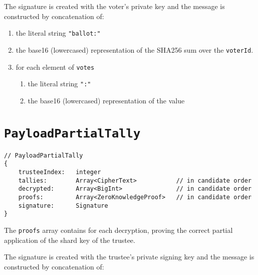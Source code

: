 The signature is created with the voter's private key and the message is constructed by concatenation of:


\begin{enumerate}
  \item the literal string \lstinline[style=ES6]{"ballot:"}
  \item the base16 (lowercased) representation of the SHA256 sum over the \texttt{voterId}.
  \item for each element of \texttt{votes}
        \begin{enumerate}
          \item the literal string \lstinline[style=ES6]{":"}
          \item the base16 (lowercased) representation of the value
        \end{enumerate}
\end{enumerate}

\section*{\texttt{PayloadPartialTally}}
\label{dt:payload:tally}
\begin{lstlisting}[style=ES6]
// PayloadPartialTally
{
    trusteeIndex:   integer
    tallies:        Array<CipherText>           // in candidate order
    decrypted:      Array<BigInt>               // in candidate order
    proofs:         Array<ZeroKnowledgeProof>   // in candidate order
    signature:      Signature
}
\end{lstlisting}

The \texttt{proofs} array contains  for each decryption, proving the correct partial application of the shard key of the trustee.

The signature is created with the trustee's private signing key and the message is constructed by concatenation of:


